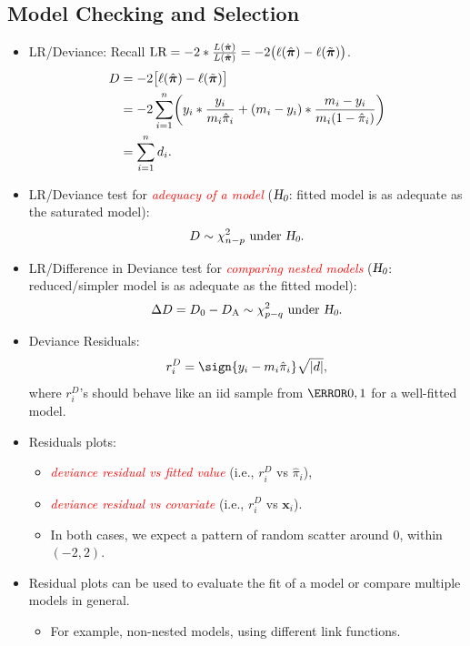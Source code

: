 \documentclass[oneside]{book}\usepackage[]{graphicx}\usepackage[svgnames]{xcolor}
\let\log\relax%
\newcommand{\HN}{\textsl{H}_{\textsl{0}}}%
\DeclarePairedDelimiter\abs{\lvert}{\rvert}
\providecommand{\Vector}[1]{\bm{#1}}%
\begin{document}
\subsection*{Model Checking and Selection}
\begin{itemize}
      \item LR/Deviance: Recall $ \text{LR}=-2\log*{\frac{L(\hat{\Vector{\pi}})}{L(\tilde{\Vector{\pi}})}}=
                  -2\bigl(\ell(\hat{\Vector{\pi}})-\ell(\tilde{\Vector{\pi}})\bigr) $.
            \begin{align*}
                  D
                   & =-2\bigl[\ell(\hat{\Vector{\pi}})-\ell(\tilde{\Vector{\pi}})\bigr]                                                        \\
                   & =-2 \sum_{i=1}^{n} \biggl(y_i\log*{\frac{y_i}{m_i\hat{\pi}_i}}+(m_i-y_i)\log*{\frac{m_i-y_i}{m_i(1-\hat{\pi}_i)} }\biggr) \\
                   & =\sum_{i=1}^{n} d_i.
            \end{align*}
      \item LR/Deviance test for \textcolor{Red}{\emph{adequacy of a model}} ($ \HN $: fitted model is as adequate as the saturated model):
            \[ D \sim \chi^2_{n-p}\text{ under $\HN$}. \]
      \item LR/Difference in Deviance test for \textcolor{Red}{\emph{comparing nested models}} ($ \HN $: reduced/simpler model is as adequate as the fitted model):
            \[ \Delta D=D_0-D_\text{A} \sim \chi^2_{p-q}\text{ under $ \HN $}. \]
      \item Deviance Residuals:
            \[ r_i^D = \sign{y_i-m_i\hat{\pi}_i}\sqrt{\abs{d}}, \]
            where $ r_i^D $'s should behave like an iid sample from $ \N{0,1} $ for a well-fitted model.
      \item Residuals plots:
            \begin{itemize}
                  \item \textcolor{Red}{\emph{deviance residual vs fitted value}} (i.e., $ r_i^D $ vs $ \hat{\pi}_i $),
                  \item \textcolor{Red}{\emph{deviance residual vs covariate}} (i.e., $ r_i^D $ vs $ \Vector{x}_i $).
                  \item In both cases, we expect a pattern of random scatter around $ 0 $, within $ (-2,2) $.
            \end{itemize}
      \item Residual plots can be used to evaluate the fit of a model or compare multiple models in general.
            \begin{itemize}
                  \item For example, non-nested models, using different link functions.
            \end{itemize}
\end{itemize}
\end{document}
